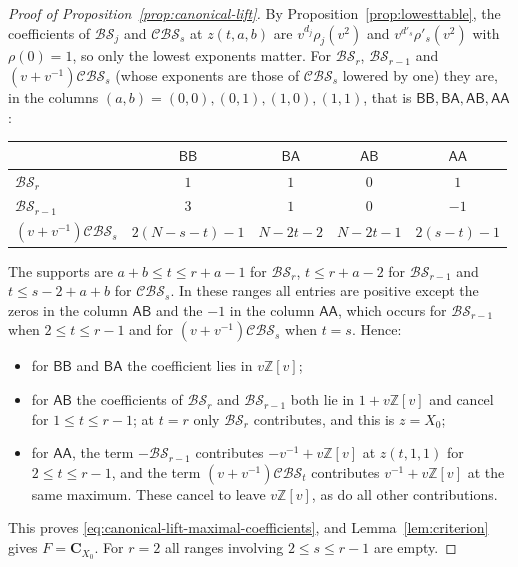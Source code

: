 \documentclass[11pt,a4paper,reqno]{amsart}
\numberwithin{equation}{section}
\theoremstyle{definition}
\theoremstyle{remark}
\theoremstyle{plain}
\newcommand{\C}{\mathbf C}
\newcommand{\A}{\mathsf A}
\newcommand{\B}{\mathsf B}
\newcommand{\R}{\mathcal {BS}}
\newcommand{\V}{\mathcal {CBS}}
\begin{document}
\begin{proof}[Proof of Proposition~\ref{prop:canonical-lift}]
By Proposition~\ref{prop:lowesttable}, the coefficients of $\R_j$ and $\V_s$ at $z(t,a,b)$ are $v^{d_j}\rho_j(v^2)$ and
$v^{d'_s}\rho'_s(v^2)$ with $\rho(0)=1$, so only the lowest exponents matter. For $\R_r$, $\R_{r-1}$ and $(v+v^{-1})\V_s$
(whose exponents are those of $\V_s$ lowered by one) they are, in the columns $(a,b)=(0,0),(0,1),(1,0),(1,1)$, that is $\B\B,\B\A,\A\B,\A\A$:
\begin{center}
\renewcommand{\arraystretch}{1.2}
\begin{tabular}{@{}lcccc@{}}
\toprule
 & $\B\B$ & $\B\A$ & $\A\B$ & $\A\A$\\
\midrule
$\R_r$     & $1$ & $1$ & $0$ & $1$\\
$\R_{r-1}$ & $3$ & $1$ & $0$ & $-1$\\
$(v+v^{-1})\V_s$ & $2(N-s-t)-1$ & $N-2t-2$ & $N-2t-1$ & $2(s-t)-1$\\
\bottomrule
\end{tabular}
\end{center}
The supports are $a+b\leq t\leq r+a-1$ for $\R_r$, $t\leq r+a-2$ for $\R_{r-1}$ and $t\leq s-2+a+b$ for $\V_s$.
In these ranges all entries are positive except the zeros in the column $\A\B$ and the $-1$ in the column $\A\A$, which occurs for
$\R_{r-1}$ when $2\leq t\leq r-1$ and for $(v+v^{-1})\V_s$ when $t=s$. Hence:
\begin{itemize}
\item for $\B\B$ and $\B\A$ the coefficient lies in $v\mathbb Z[v]$;
\item for $\A\B$ the coefficients of $\R_r$ and $\R_{r-1}$ both lie in $1+v\mathbb Z[v]$ and cancel for $1\leq t\leq r-1$; at $t=r$ only
$\R_r$ contributes, and this is $z=X_0$;
\item for $\A\A$, the term $-\R_{r-1}$ contributes $-v^{-1}+v\mathbb Z[v]$ at $z(t,1,1)$ for $2\leq t\leq r-1$, and the term
$(v+v^{-1})\V_t$ contributes $v^{-1}+v\mathbb Z[v]$ at the same maximum. These cancel to leave $v\mathbb Z[v]$, as do all other contributions.
\end{itemize}
This proves \eqref{eq:canonical-lift-maximal-coefficients}, and Lemma~\ref{lem:criterion} gives $F=\C_{X_0}$.
For $r=2$ all ranges involving $2\leq s\leq r-1$ are empty.
\end{proof}
\end{document}
